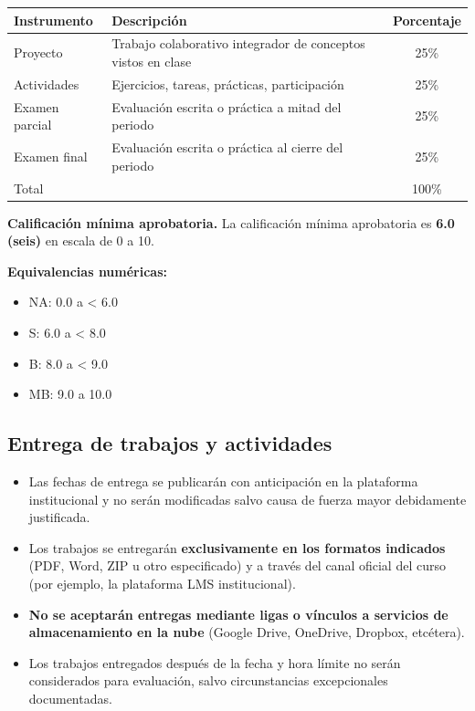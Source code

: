 \documentclass[12pt]{article}
\begin{document}
	\begin{center}
		\begin{tabular}{|l|p{7cm}|c|}
			\hline
			\textbf{Instrumento} & \textbf{Descripción} & \textbf{Porcentaje} \\
			\hline
			Proyecto & Trabajo colaborativo integrador de conceptos vistos en clase & 25\% \\
			\hline
			Actividades & Ejercicios, tareas, prácticas, participación & 25\% \\
			\hline
			Examen parcial & Evaluación escrita o práctica a mitad del periodo & 25\% \\
			\hline
			Examen final & Evaluación escrita o práctica al cierre del periodo & 25\% \\
			\hline
			Total & & 100\% \\
			\hline
		\end{tabular}
	\end{center}
	
	\vspace{0.5em}
	
	\noindent\textbf{Calificación mínima aprobatoria.} La calificación mínima aprobatoria es \textbf{6.0 (seis)} en escala de 0 a 10.
	
	\noindent\textbf{Equivalencias numéricas:}
	\begin{itemize}
		\item NA: 0.0 a < 6.0
		\item S: 6.0 a < 8.0
		\item B: 8.0 a < 9.0
		\item MB: 9.0 a 10.0
	\end{itemize}
	
	\subsection*{Entrega de trabajos y actividades}
	
	\begin{itemize}
		\item Las fechas de entrega se publicarán con anticipación en la plataforma institucional y no serán modificadas salvo causa de fuerza mayor debidamente justificada.
		\item Los trabajos se entregarán \textbf{exclusivamente en los formatos indicados} (PDF, Word, ZIP u otro especificado) y a través del canal oficial del curso (por ejemplo, la plataforma LMS institucional).
		\item \textbf{No se aceptarán entregas mediante ligas o vínculos a servicios de almacenamiento en la nube} (Google Drive, OneDrive, Dropbox, etcétera).
		\item Los trabajos entregados después de la fecha y hora límite no serán considerados para evaluación, salvo circunstancias excepcionales documentadas.
	\end{itemize}
	
\end{document}
